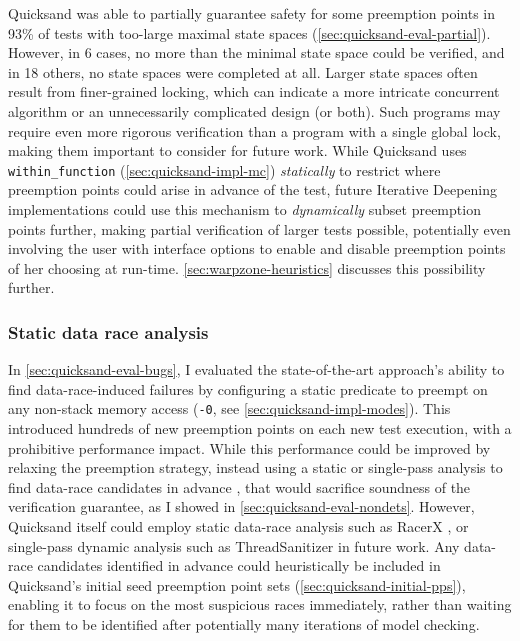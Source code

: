 Quicksand was able to partially guarantee safety for some preemption points
in 93\% of tests with too-large maximal state spaces (\cref{sec:quicksand-eval-partial}).
However, in 6 cases, no more than the minimal state space could be verified,
and in 18 others, no state spaces were completed at all.
Larger state spaces often result from finer-grained locking,
which can indicate a more intricate concurrent algorithm or an unnecessarily complicated design (or both).
Such programs may require even more rigorous verification than a program with a single global lock,
making them important to consider for future work.
While Quicksand uses {\tt within\_function} (\cref{sec:quicksand-impl-mc})
{\em statically} to restrict where preemption points could arise in advance of the test,
future
Iterative Deepening
implementations could use this mechanism to {\em dynamically} subset preemption points further,
making partial verification of larger tests possible,
potentially even involving the user with interface options
to enable and disable preemption points of her choosing at run-time.
\cref{sec:warpzone-heuristics} discusses this possibility further.

\subsubsection{Static data race analysis}

In \cref{sec:quicksand-eval-bugs}, I evaluated the state-of-the-art approach's ability to find data-race-induced failures
by configuring a static predicate to preempt on any non-stack memory access
({\tt -0}, see \cref{sec:quicksand-impl-modes}).
This introduced hundreds of new preemption points on each new test execution,
with a prohibitive performance impact.
While this performance could be improved by
relaxing the preemption strategy,
instead using a static or single-pass analysis to find data-race candidates in advance \cite{portend},
that would sacrifice soundness of the verification guarantee, as I showed in \cref{sec:quicksand-eval-nondets}.
However, Quicksand itself could employ static data-race analysis such as RacerX \cite{racerx},
or single-pass dynamic analysis such as ThreadSanitizer \cite{tsan} in future work.
Any data-race candidates identified in advance could heuristically be included in Quicksand's initial seed preemption point sets
(\cref{sec:quicksand-initial-pps}),
enabling it to focus on the most suspicious races immediately,
rather than waiting for them to be identified after potentially many iterations of model checking.

